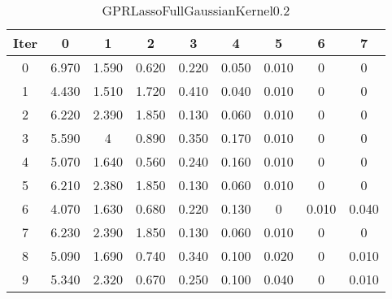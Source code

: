 \begin{table}
	\begin{center}
		\begin{tabular}{|c|c|c|c|c|c|c|c|c|}
			\hline
			Iter & 0 & 1 & 2 & 3 & 4 & 5 & 6 & 7 \\
			\hline
			0 & 6.970 & 1.590 & 0.620 & 0.220 & 0.050 & 0.010 & 0 & 0 \\
			\hline
			1 & 4.430 & 1.510 & 1.720 & 0.410 & 0.040 & 0.010 & 0 & 0 \\
			\hline
			2 & 6.220 & 2.390 & 1.850 & 0.130 & 0.060 & 0.010 & 0 & 0 \\
			\hline
			3 & 5.590 & 4 & 0.890 & 0.350 & 0.170 & 0.010 & 0 & 0 \\
			\hline
			4 & 5.070 & 1.640 & 0.560 & 0.240 & 0.160 & 0.010 & 0 & 0 \\
			\hline
			5 & 6.210 & 2.380 & 1.850 & 0.130 & 0.060 & 0.010 & 0 & 0 \\
			\hline
			6 & 4.070 & 1.630 & 0.680 & 0.220 & 0.130 & 0 & 0.010 & 0.040 \\
			\hline
			7 & 6.230 & 2.390 & 1.850 & 0.130 & 0.060 & 0.010 & 0 & 0 \\
			\hline
			8 & 5.090 & 1.690 & 0.740 & 0.340 & 0.100 & 0.020 & 0 & 0.010 \\
			\hline
			9 & 5.340 & 2.320 & 0.670 & 0.250 & 0.100 & 0.040 & 0 & 0.010 \\
			\hline
		\end{tabular}
	\end{center}
	\caption{GPRLassoFullGaussianKernel0.2}
\end{table}